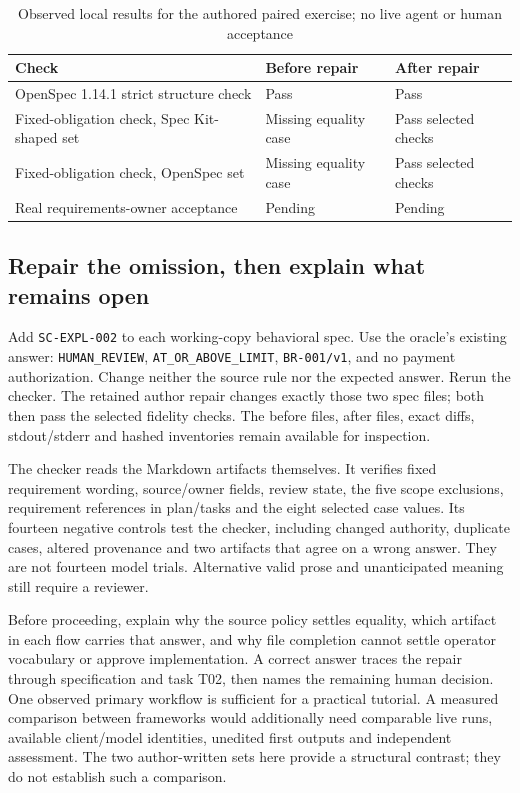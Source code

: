 \begin{table}[htbp]\centering\small
\caption{Observed local results for the authored paired exercise; no live agent or human acceptance}\label{tab:ch4-paired-results}
\begin{tabularx}{\textwidth}{@{}X p{}p{}@{}}\toprule
\textbf{Check} & \textbf{Before repair} & \textbf{After repair}\\\midrule
OpenSpec 1.14.1 strict structure check & Pass & Pass\\
Fixed-obligation check, Spec Kit-shaped set & Missing equality case & Pass selected checks\\
Fixed-obligation check, OpenSpec set & Missing equality case & Pass selected checks\\
Real requirements-owner acceptance & Pending & Pending\\\bottomrule
\end{tabularx}
\end{table}

\subsection{Repair the omission, then explain what remains open}

Add \texttt{SC-EXPL-002} to each working-copy behavioral spec. Use the oracle's existing answer: \texttt{HUMAN\_REVIEW}, \texttt{AT\_OR\_ABOVE\_LIMIT}, \texttt{BR-001/v1}, and no payment authorization. Change neither the source rule nor the expected answer. Rerun the checker. The retained author repair changes exactly those two spec files; both then pass the selected fidelity checks. The before files, after files, exact diffs, stdout/stderr and hashed inventories remain available for inspection.

The checker reads the Markdown artifacts themselves. It verifies fixed requirement wording, source/owner fields, review state, the five scope exclusions, requirement references in plan/tasks and the eight selected case values. Its fourteen negative controls test the checker, including changed authority, duplicate cases, altered provenance and two artifacts that agree on a wrong answer. They are not fourteen model trials. Alternative valid prose and unanticipated meaning still require a reviewer.

Before proceeding, explain why the source policy settles equality, which artifact in each flow carries that answer, and why file completion cannot settle operator vocabulary or approve implementation. A correct answer traces the repair through specification and task T02, then names the remaining human decision. One observed primary workflow is sufficient for a practical tutorial. A measured comparison between frameworks would additionally need comparable live runs, available client/model identities, unedited first outputs and independent assessment. The two author-written sets here provide a structural contrast; they do not establish such a comparison.

